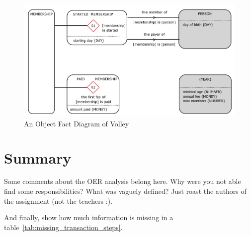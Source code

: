 \begin{figure}[h]\centering
	\includegraphics[width=12cm]{pic/VolleyOFD.png}
	\caption{An Object Fact Diagram of Volley~\cite{dietz2020enterprise}}
	\label{fig:ofdModel}
\end{figure}


\section{Summary}

Some comments about the OER analysis belong here. Why were you not able find some responsibilities? What was vaguely defined? Just roast the authors of the assignment (not the teachers :). 

And finally, show how much information is missing in a table~\cref{tab:missing_transaction_steps}. 

